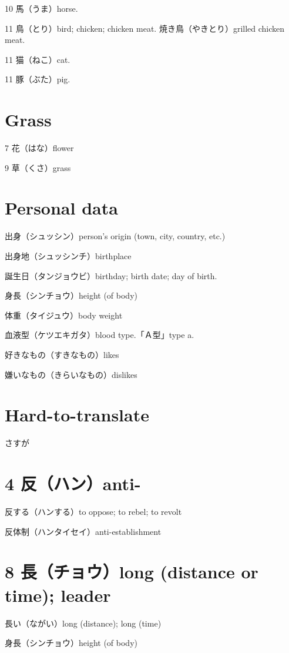 10 馬（うま）horse.

11 鳥（とり）bird; chicken; chicken meat.
焼き鳥（やきとり）grilled chicken meat.

11 猫（ねこ）cat.

11 豚（ぶた）pig.

\section{Grass}

7 花（はな）flower

9 草（くさ）grass

\section{Personal data}

出身（シュッシン）person's origin (town, city, country, etc.)

出身地（シュッシンチ）birthplace

誕生日（タンジョウビ）birthday; birth date; day of birth.

身長（シンチョウ）height (of body)

体重（タイジュウ）body weight

血液型（ケツエキガタ）blood type.「Ａ型」type a.

好きなもの（すきなもの）likes

嫌いなもの（きらいなもの）dislikes

\section{Hard-to-translate}

さすが

\section{4 反（ハン）anti-}

反する（ハンする）to oppose; to rebel; to revolt

反体制（ハンタイセイ）anti-establishment

\section{8 長（チョウ）long (distance or time); leader}

長い（ながい）long (distance); long (time)

身長（シンチョウ）height (of body)

